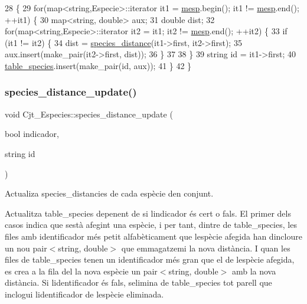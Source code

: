 \begin{DoxyCode}
28                                         \{
29     \textcolor{keywordflow}{for}(map<string,Especie>::iterator it1 = \hyperlink{class_cjt___especies_a64a525b38c78935e7432b362ea9a2306}{mesp}.begin(); it1 != \hyperlink{class_cjt___especies_a64a525b38c78935e7432b362ea9a2306}{mesp}.end(); ++it1) \{
30         map<string, double> aux;
31         \textcolor{keywordtype}{double} dist;
32         \textcolor{keywordflow}{for}(map<string,Especie>::iterator it2 = it1; it2 != \hyperlink{class_cjt___especies_a64a525b38c78935e7432b362ea9a2306}{mesp}.end(); ++it2) \{
33             \textcolor{keywordflow}{if} (it1 != it2) \{
34                 dist = \hyperlink{class_cjt___especies_abf55093b325fd101ef73aa18dd1cf823}{species\_distance}(it1->first, it2->first);
35                 aux.insert(make\_pair(it2->first, dist));
36             \}
37             
38         \}
39         \textcolor{keywordtype}{string} \textcolor{keywordtype}{id} = it1->first;
40         \hyperlink{class_cjt___especies_ae56d242080836b8d3db505f0a8623090}{table\_species}.insert(make\_pair(\textcolor{keywordtype}{id}, aux));
41     \}
42 \}
\end{DoxyCode}
\mbox{\label{class_cjt___especies_a043f6ce127ac78eb891f6d004eee40b0}} 
\subsubsection{\texorpdfstring{species\+\_\+distance\+\_\+update()}{species\_distance\_update()}}
{\footnotesize\ttfamily void Cjt\+\_\+\+Especies\+::species\+\_\+distance\+\_\+update (\begin{DoxyParamCaption}\item[{bool}]{indicador,  }\item[{string}]{id }\end{DoxyParamCaption})}



Actualiza species\+\_\+distancies de cada espècie d\textquotesingle{}en conjunt. 

Actualitza table\+\_\+species depenent de si l\textquotesingle{}indicador és cert o fals. El primer dels casos indica que s\textquotesingle{}està afegint una espècie, i per tant, dintre de table\+\_\+species, les files amb identificador més petit alfabèticament que l\textquotesingle{}espècie afegida han d\textquotesingle{}incloure un nou pair$<$string, double$>$ que emmagatzemi la nova distància. I quan les files de table\+\_\+species tenen un identificador més gran que el de l\textquotesingle{}espècie afegida, es crea a la fila del la nova espècie un pair$<$string, double$>$ amb la nova distància. Si l\textquotesingle{}identificador és fals, s\textquotesingle{}elimina de table\+\_\+species tot parell que inclogui l\textquotesingle{}identificador de l\textquotesingle{}espècie eliminada.

